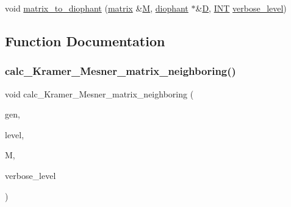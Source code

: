 \begin{DoxyCompactItemize}
\item 
void \mbox{\hyperlink{discreta__global_8_c_a071668912330608663604617e17cc22c}{matrix\+\_\+to\+\_\+diophant}} (\mbox{\hyperlink{classmatrix}{matrix}} \&\mbox{\hyperlink{plane__search_8_c_ad2d23ebd03187a91edd45b1d5e496265}{M}}, \mbox{\hyperlink{classdiophant}{diophant}} $\ast$\&\mbox{\hyperlink{costas_8_c_af13967e8da5ae214c112fd612639beaa}{D}}, \mbox{\hyperlink{galois_8h_a09fddde158a3a20bd2dcadb609de11dc}{I\+NT}} \mbox{\hyperlink{simeon_8_c_a818073fbcc2f439e7c56952f67386122}{verbose\+\_\+level}})
\end{DoxyCompactItemize}


\subsection{Function Documentation}
\mbox{\label{discreta__global_8_c_a6b625d682466fc26907c21e23a378cf8}} 
\subsubsection{\texorpdfstring{calc\+\_\+\+Kramer\+\_\+\+Mesner\+\_\+matrix\+\_\+neighboring()}{calc\_Kramer\_Mesner\_matrix\_neighboring()}}
{\footnotesize\ttfamily void calc\+\_\+\+Kramer\+\_\+\+Mesner\+\_\+matrix\+\_\+neighboring (\begin{DoxyParamCaption}\item[{\mbox{\hyperlink{classgenerator}{generator}} $\ast$}]{gen,  }\item[{\mbox{\hyperlink{galois_8h_a09fddde158a3a20bd2dcadb609de11dc}{I\+NT}}}]{level,  }\item[{\mbox{\hyperlink{classmatrix}{matrix}} \&}]{M,  }\item[{\mbox{\hyperlink{galois_8h_a09fddde158a3a20bd2dcadb609de11dc}{I\+NT}}}]{verbose\+\_\+level }\end{DoxyParamCaption})}

\mbox{\label{discreta__global_8_c_a549beed551d022bee89ffa9f959ec9fb}} 
